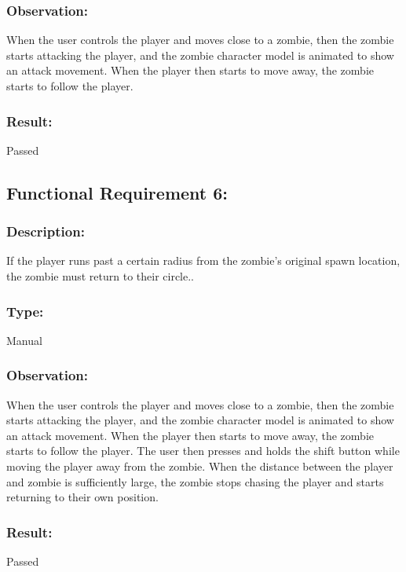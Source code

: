 \documentclass[12pt, titlepage]{article}
\begin{document}
\subsubsection{Observation: } When the user controls the player and moves close to a zombie, then the zombie starts attacking the player, and the zombie character model is animated to show an attack movement. When the player then starts to move away, the zombie starts to follow the player.

\subsubsection[Pass / Fail:] {Result: } Passed


\subsection{Functional Requirement 6: } 

\subsubsection{Description: }If the player runs past a certain radius from the zombie's original spawn location, the zombie must return to their circle..

\subsubsection{Type: } Manual

\subsubsection{Observation: } When the user controls the player and moves close to a zombie, then the zombie starts attacking the player, and the zombie character model is animated to show an attack movement. When the player then starts to move away, the zombie starts to follow the player. The user then presses and holds the shift button while moving the player away from the zombie. When the distance between the player and zombie is sufficiently large, the zombie stops chasing the player and starts returning to their own position.

\subsubsection[Pass / Fail:] {Result: } Passed
\end{document}
